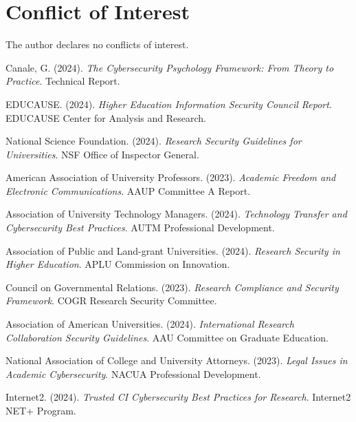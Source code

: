 \documentclass[10pt, twocolumn]{article}
\begin{document}
\section*{Conflict of Interest}

The author declares no conflicts of interest.

\begin{thebibliography}{99}

Canale, G. (2024). \textit{The Cybersecurity Psychology Framework: From Theory to Practice}. Technical Report.

EDUCAUSE. (2024). \textit{Higher Education Information Security Council Report}. EDUCAUSE Center for Analysis and Research.

National Science Foundation. (2024). \textit{Research Security Guidelines for Universities}. NSF Office of Inspector General.

American Association of University Professors. (2023). \textit{Academic Freedom and Electronic Communications}. AAUP Committee A Report.

Association of University Technology Managers. (2024). \textit{Technology Transfer and Cybersecurity Best Practices}. AUTM Professional Development.

Association of Public and Land-grant Universities. (2024). \textit{Research Security in Higher Education}. APLU Commission on Innovation.

Council on Governmental Relations. (2023). \textit{Research Compliance and Security Framework}. COGR Research Security Committee.

Association of American Universities. (2024). \textit{International Research Collaboration Security Guidelines}. AAU Committee on Graduate Education.

National Association of College and University Attorneys. (2023). \textit{Legal Issues in Academic Cybersecurity}. NACUA Professional Development.

Internet2. (2024). \textit{Trusted CI Cybersecurity Best Practices for Research}. Internet2 NET+ Program.

\end{thebibliography}
\end{document}
